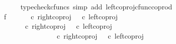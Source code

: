 \begin{isabellebody}
\ \ \ \ \isamarkupfalse%
\ {\isacharparenleft}{\kern0pt}typecheck{\isacharunderscore}{\kern0pt}cfuncs{\isacharcomma}{\kern0pt}\ simp\ add{\isacharcolon}{\kern0pt}\ left{\isacharunderscore}{\kern0pt}coproj{\isacharunderscore}{\kern0pt}cfunc{\isacharunderscore}{\kern0pt}coprod{\isacharparenright}{\kern0pt}\isanewline
\ \ \isamarkupfalse%
\ f{}{\isacharcolon}{\kern0pt}\ {\isachardoublequoteopen}{\isasymlangle}{\isasymf}{\isacharcomma}{\kern0pt}\ {\isasymf}{\isasymrangle}\ {\isasymamalg}\ {\isasymlangle}{\isasymt}{\isacharcomma}{\kern0pt}{\isasymf}{\isasymrangle}\ {\isasymamalg}\ {\isasymlangle}{\isasymf}{\isacharcomma}{\kern0pt}{\isasymt}{\isasymrangle}\ {\isasymcirc}\isactrlsub c\ {\isacharparenleft}{\kern0pt}right{\isacharunderscore}{\kern0pt}coproj\ {\isasymone}\ {\isacharparenleft}{\kern0pt}{\isasymone}{\isasymCoprod}{\isasymone}{\isacharparenright}{\kern0pt}\ {\isasymcirc}\isactrlsub c\ left{\isacharunderscore}{\kern0pt}coproj\ {\isasymone}\ {\isasymone}{\isacharparenright}{\kern0pt}\ {\isacharequal}{\kern0pt}\ {\isasymlangle}{\isasymt}{\isacharcomma}{\kern0pt}{\isasymf}{\isasymrangle}{\isachardoublequoteclose}\isanewline
\ \ \isamarkupfalse%
{\isacharminus}{\kern0pt}\ \isanewline
\ \ \ \ \isamarkupfalse%
\ {\isachardoublequoteopen}{\isasymlangle}{\isasymf}{\isacharcomma}{\kern0pt}\ {\isasymf}{\isasymrangle}\ {\isasymamalg}\ {\isasymlangle}{\isasymt}{\isacharcomma}{\kern0pt}{\isasymf}{\isasymrangle}\ {\isasymamalg}\ {\isasymlangle}{\isasymf}{\isacharcomma}{\kern0pt}{\isasymt}{\isasymrangle}\ {\isasymcirc}\isactrlsub c\ right{\isacharunderscore}{\kern0pt}coproj\ {\isasymone}\ {\isacharparenleft}{\kern0pt}{\isasymone}{\isasymCoprod}{\isasymone}{\isacharparenright}{\kern0pt}\ {\isasymcirc}\isactrlsub c\ left{\isacharunderscore}{\kern0pt}coproj\ {\isasymone}\ {\isasymone}\ {\isacharequal}{\kern0pt}\ \isanewline
\ \ \ \ \ \ \ \ \ \ {\isacharparenleft}{\kern0pt}{\isasymlangle}{\isasymf}{\isacharcomma}{\kern0pt}\ {\isasymf}{\isasymrangle}\ {\isasymamalg}\ {\isasymlangle}{\isasymt}{\isacharcomma}{\kern0pt}{\isasymf}{\isasymrangle}\ {\isasymamalg}\ {\isasymlangle}{\isasymf}{\isacharcomma}{\kern0pt}{\isasymt}{\isasymrangle}\ {\isasymcirc}\isactrlsub c\ right{\isacharunderscore}{\kern0pt}coproj\ {\isasymone}\ {\isacharparenleft}{\kern0pt}{\isasymone}{\isasymCoprod}{\isasymone}{\isacharparenright}{\kern0pt}{\isacharparenright}{\kern0pt}\ {\isasymcirc}\isactrlsub c\ left{\isacharunderscore}{\kern0pt}coproj\ {\isasymone}\ {\isasymone}{\isachardoublequoteclose}\isanewline
\ \ \ \ \ \ \isamarkupfalse%

\end{isabellebody}
